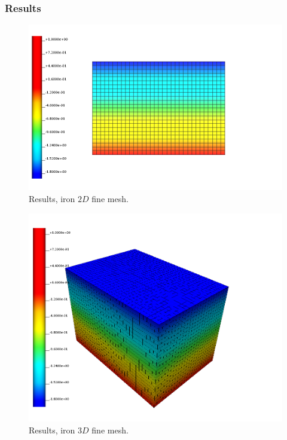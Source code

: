 \subsubsection{Results}
%
\begin{figure}[h!]
    \centering 
    \includegraphics[width=0.9\columnwidth]{examples/example-0101/doc/figures/l160x120x000_n32x24x00_i1_s0.png} 
    \caption{Results, iron $2D$ fine mesh.}
    \label{example-0101-iron-2D-fig}
\end{figure}
%
\begin{figure}[h!]
    \centering 
    \includegraphics[width=0.9\columnwidth]{examples/example-0101/doc/figures/l160x120x120_n32x24x24_i1_s0.png} 
    \caption{Results, iron $3D$ fine mesh.}
    \label{example-0101-iron-3D-fig}
\end{figure}
%
%
